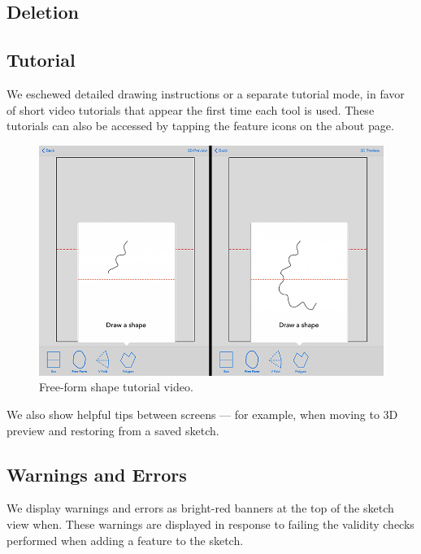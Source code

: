 \subsection{Deletion}\label{deletion}

\subsection{Tutorial}\label{tutorial}

We eschewed detailed drawing instructions or a separate tutorial mode,
in favor of short video tutorials that appear the first time each tool
is used. These tutorials can also be accessed by tapping the feature
icons on the about page.

\begin{figure}[htbp]
\centering
\includegraphics{figures/32_UI_Tool_Interactions/tutorial_step_one_two.png}
\caption{Free-form shape tutorial video.}
\end{figure}

We also show helpful tips between screens --- for example, when moving
to 3D preview and restoring from a saved sketch.

\subsection{Warnings and Errors}\label{warnings-and-errors}

We display warnings and errors as bright-red banners at the top of the
sketch view when. These warnings are displayed in response to failing
the validity checks performed when adding a feature to the sketch.

